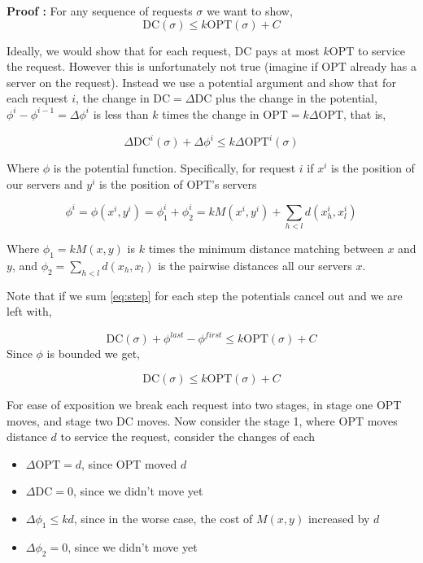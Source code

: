 \documentclass[11pt]{article}
\newcommand{\DC}{\text{DC}}
\newcommand{\OPT}{\text{OPT}}
\begin{document}
\textbf{Proof :} For any sequence of requests $\sigma$ we want to show,
\begin{equation}
\DC(\sigma) \leq k \OPT(\sigma) + C
\end{equation}

Ideally, we would show that for each request, $\DC$ pays at most $k\OPT$ to service the request. 
However this is unfortunately not true (imagine if $\OPT$ already has a server on the request).
Instead we use a potential argument and show that for each request $i$, the change in $\DC = \Delta\DC$ plus
the change in the potential, $\phi^{i} - \phi^{i-1} = \Delta\phi^i$ is less than $k$ times the change in $\OPT = k\Delta\OPT$, 
that is,

\begin{equation}
\Delta\DC^i(\sigma) + \Delta\phi^{i} \leq k \Delta\OPT^i(\sigma)
\label{eq:step}
\end{equation}

Where $\phi$ is the potential function. Specifically, for request $i$ if $x^i$ is the position of 
our servers and $y^i$ is the position of OPT's servers

$$
\phi^i = \phi(x^i, y^i) = \phi_1^i +  \phi_2^i = kM(x^i, y^i) + \sum_{h<l} d(x_h^i, x_l^i)
$$

Where $\phi_1 = kM(x,y)$ is $k$ times the minimum distance matching between $x$ and $y$, and $ \phi_2 = \sum_{h<l} d(x_h, x_l)$ 
is the pairwise distances all our servers $x$. 

Note that if we sum \ref{eq:step} for each step the potentials cancel out and we are left with, 

$$
\DC(\sigma) + \phi^{last} - \phi^{first} \leq k \OPT(\sigma) + C
$$
Since $\phi$ is bounded we get,

$$
\DC(\sigma) \leq k \OPT(\sigma) + C
$$

For ease of exposition we break each request into two stages, in stage one OPT moves, 
and stage two DC moves. Now consider the stage 1, where OPT moves distance $d$ to service the 
request, consider the changes of each 

\begin{itemize}
		\item $\Delta\OPT = d$, since OPT moved $d$
		\item $\Delta\DC = 0$, since we didn't move yet
		\item $\Delta\phi_1 \leq kd$, since in the worse case, the cost of $M(x,y)$ increased by $d$
		\item $\Delta\phi_2 = 0$, since we didn't move yet
\end{itemize}
\end{document}
